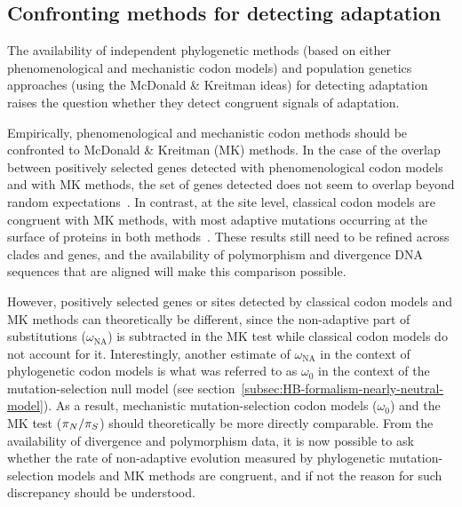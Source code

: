 \subsection{Confronting methods for detecting adaptation}
\label{subsec:confronting-methods-for-detecting-adaptation}

The availability of independent phylogenetic methods (based on either phenomenological and mechanistic \gls{codon} models) and population genetics approaches (using the McDonald \& Kreitman ideas) for detecting adaptation raises the question whether they detect congruent signals of adaptation.

Empirically, phenomenological and mechanistic \gls{codon} methods should be confronted to McDonald \& Kreitman (\acrshort{MK}) methods.
In the case of the overlap between positively selected genes detected with phenomenological \gls{codon} models and with \acrshort{MK} methods, the set of genes detected does not seem to overlap beyond random expectations~\citep{He2020}.
In contrast, at the site level, classical \gls{codon} models are congruent with \acrshort{MK} methods, with most adaptive mutations occurring at the surface of proteins in both methods~\citep{Moutinho2019}.
These results still need to be refined across clades and genes, and the availability of polymorphism and divergence \acrshort{DNA} sequences that are aligned will make this comparison possible.

However, positively selected genes or sites detected by classical \gls{codon} models and \acrshort{MK} methods can theoretically be different, since the non-adaptive part of \glspl{substitution} ($\omega_{\text{NA}}$) is subtracted in the \acrshort{MK} test while classical \gls{codon} models do not account for it.
Interestingly, another estimate of $\omega_{\text{NA}}$ in the context of phylogenetic \gls{codon} models is what was referred to as $\omega_0$ in the context of the mutation-selection null model (see section~\ref{subsec:HB-formalism-nearly-neutral-model}).
As a result, mechanistic mutation-selection \gls{codon} models ($\omega_0$) and the \acrshort{MK} test ($\pi_N / \pi_S$) should theoretically be more directly comparable.
From the availability of divergence and polymorphism data, it is now possible to ask whether the rate of non-adaptive evolution measured by phylogenetic mutation-selection models and \acrshort{MK} methods are congruent, and if not the reason for such discrepancy should be understood.

